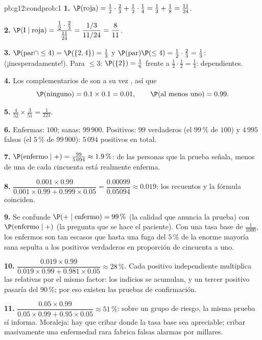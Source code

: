 \begin{solution}{pb:g12:condprob:1}
\textbf{1.} $\P(\text{roja}) = \frac12 \cdot \frac23 + \frac12
\cdot \frac14 = \frac13 + \frac18 = \frac{11}{24}$.

\textbf{2.} $\P(\text{I} \mid \text{roja}) =
\dfrac{\frac12 \cdot \frac23}{\frac{11}{24}} =
\dfrac{1/3}{11/24} = \dfrac{8}{11}$.

\textbf{3.} $\P(\text{par} \cap \leq 4) = \P(\{2, 4\}) = \frac13$ y
$\P(\text{par})\P(\leq 4) = \frac12 \cdot \frac23 = \frac13$:
 (¡inesperadamente!). Para $\leq 3$: $\P(\{2\}) = \frac16$
frente a $\frac12 \cdot \frac12 = \frac14$: dependientes.

\textbf{4.} Los complementarios de   son a su vez
, así que
\[
\P(\text{ninguno}) = 0.1 \times 0.1 = 0.01,
\qquad
\P(\text{al menos uno}) = 0.99 .
\]

\textbf{5.} $\frac{4}{52} \times \frac{3}{51} = \frac{1}{221}$.

\textbf{6.} Enfermas: $100$; sanas: $99\,900$. Positivos: $99$ verdaderos
(el $99\,\%$ de $100$) y $4\,995$ falsos (el $5\,\%$ de $99\,900$):
$5\,094$ positivos en total.

\textbf{7.} $\P(\text{enfermo} \mid +) = \frac{99}{5\,094}
\approx 1.9\,\%$: de las personas que la prueba señala, menos de una de
cada cincuenta está realmente enferma.

\textbf{8.} $\dfrac{0.001 \times 0.99}{0.001 \times 0.99 +
0.999 \times 0.05} = \dfrac{0.00099}{0.05094} \approx 0.019$: los
recuentos y la fórmula coinciden.

\textbf{9.} Se confunde $\P(+ \mid \text{enfermo}) = 99\,\%$ (la calidad
que anuncia la prueba) con $\P(\text{enfermo} \mid +)$ (la pregunta que se
hace el paciente). Con una tasa base de $\frac{1}{1000}$, los enfermos son
tan escasos que hasta una fuga del $5\,\%$ de la enorme mayoría sana
sepulta a los positivos verdaderos en proporción de cincuenta a uno.

\textbf{10.} $\dfrac{0.019 \times 0.99}{0.019 \times 0.99 +
0.981 \times 0.05} \approx 28\,\%$. Cada positivo independiente multiplica
las  relativas por el mismo factor: los indicios se acumulan,
y un tercer positivo pasaría del $90\,\%$; por eso existen las pruebas de
confirmación.

\textbf{11.} $\dfrac{0.05 \times 0.99}{0.05 \times 0.99 +
0.95 \times 0.05} \approx 51\,\%$: sobre un grupo de riesgo, la misma
prueba sí informa. Moraleja: hay que cribar donde la tasa base sea
apreciable; cribar masivamente una enfermedad rara fabrica falsas alarmas
por millares.


\end{solution}
